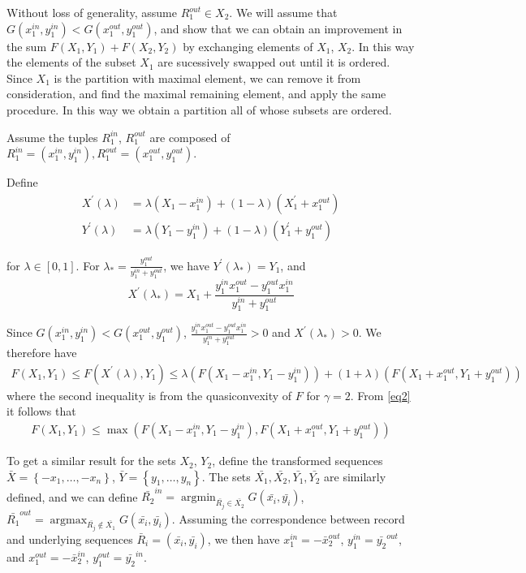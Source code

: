 \documentclass{article}
\theoremstyle{case}
\DeclareMathOperator*{\argmax}{argmax} %
\DeclareMathOperator*{\argmin}{argmin} %
\begin{document}
Without loss of generality, assume $R_1^{out} \in X_2$. We will assume that $G(x_1^{in}, y_1^{in}) < G(x_1^{out}, y_1^{out})$, and show that we can obtain an improvement in the sum $F(X_1, Y_1) + F(X_2, Y_2)$ by exchanging elements of $X_1$, $X_2$. In this way the elements of the subset $X_1$ are sucessively swapped out until it is ordered. Since $X_1$ is the partition with maximal element, we can remove it from consideration, and find the maximal remaining element, and apply the same procedure. In this way we obtain a partition all of whose subsets are ordered.

Assume the tuples $R_1^{in}$, $R_1^{out}$ are composed of $R_1^{in} = \left(x_1^{in}, y_1^{in}\right), R_1^{out} = \left(x_1^{out}, y_1^{out}\right)$.

Define
\begin{align*}
X^\prime\left( \lambda \right) & = \lambda \left( X_1 - x_1^{in}\right) + \left( 1 - \lambda\right) \left( X_1^\prime + x_1^{out}\right) \\
Y^\prime\left( \lambda \right) & = \lambda \left( Y_1 - y_1^{in}\right) + \left( 1 - \lambda\right) \left( Y_1^\prime + y_1^{out}\right)
\end{align*}

for $\lambda \in \left[ 0,1\right]$. For $\lambda_{*} = \frac{y_1^{out}}{y_1^{in} + y_1^{out}}$, we have $Y^\prime\left( \lambda_{*}\right) = Y_1$, and 
\[X^\prime\left( \lambda_{*}\right) = X_1 + \frac{y_1^{in}x_1^{out}-y_1^{out}x_1^{in}}{y_1^{in} + y_1^{out}}\]

Since $G(x_1^{in}, y_1^{in}) < G(x_1^{out}, y_1^{out})$, $\frac{y_1^{in}x_1^{out}-y_1^{out}x_1^{in}}{y_1^{in} + y_1^{out}} > 0$ and $X^\prime\left( \lambda_{*}\right) > 0$. We therefore have 
\begin{align} \label{eq2}
F(X_1, Y_1) \leq F(X^\prime\left( \lambda \right), Y_1) \leq \lambda\left( F(X_1-x_1^{in},Y_1-y_1^{in})\right) + \left( 1 + \lambda\right)\left( F(X_1+x_1^{out},Y_1+y_1^{out})\right)
\end{align}
where the second inequality is from the quasiconvexity of $F$ for $\gamma = 2$. From \ref{eq2} it follows that 
\begin{align} \label{eq3}
F(X_1, Y_1) \leq \max{\left(F(X_1-x_1^{in},Y_1-y_1^{in}), F(X_1+x_1^{out},Y_1+y_1^{out})\right)}
\end{align}

To get a similar result for the sets $X_2$, $Y_2$, define the transformed sequences $\bar{X} = \left\lbrace -x_1, \dots, -x_n\right\rbrace$, $\bar{Y} = \left\lbrace y_1, \dots, y_n\right\rbrace$. The sets $\bar{X_1}, \bar{X_2}, \bar{Y_1}, \bar{Y_2}$ are similarly defined, and we can define $\bar{R_2}^{in} = \argmin_{\bar{R_j} \in \bar{X_2}} G(\bar{x_i}, \bar{y_i})$, $\bar{R_1}^{out} = \argmax_{\bar{R_j} \not\in \bar{X_1}} G(\bar{x_i}, \bar{y_i})$. Assuming the correspondence between record and underlying sequences $\bar{R}_i = \left(\bar{x_i}, \bar{y_i}\right)$, we then have $x_1^{in} = -\bar{x}_2^{out}$, $y_1^{in} = \bar{y_2}^{out}$, and $x_1^{out} = -\bar{x}_2^{in}$, $y_1^{out} = \bar{y_2}^{in}$. 
\end{document}
